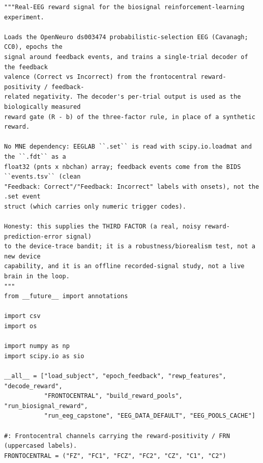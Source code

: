 \begin{lstlisting}[caption={mrl\_trace/biosignal.py},label={lst:siox-src-biosignal}]
"""Real-EEG reward signal for the biosignal reinforcement-learning experiment.

Loads the OpenNeuro ds003474 probabilistic-selection EEG (Cavanagh; CC0), epochs the
signal around feedback events, and trains a single-trial decoder of the feedback
valence (Correct vs Incorrect) from the frontocentral reward-positivity / feedback-
related negativity. The decoder's per-trial output is used as the biologically measured
reward gate (R - b) of the three-factor rule, in place of a synthetic reward.

No MNE dependency: EEGLAB ``.set`` is read with scipy.io.loadmat and the ``.fdt`` as a
float32 (pnts x nbchan) array; feedback events come from the BIDS ``events.tsv`` (clean
"Feedback: Correct"/"Feedback: Incorrect" labels with onsets), not the .set event
struct (which carries only numeric trigger codes).

Honesty: this supplies the THIRD FACTOR (a real, noisy reward-prediction-error signal)
to the device-trace bandit; it is a robustness/biorealism test, not a new device
capability, and it is an offline recorded-signal study, not a live brain in the loop.
"""
from __future__ import annotations

import csv
import os

import numpy as np
import scipy.io as sio

__all__ = ["load_subject", "epoch_feedback", "rewp_features", "decode_reward",
           "FRONTOCENTRAL", "build_reward_pools", "run_biosignal_reward",
           "run_eeg_capstone", "EEG_DATA_DEFAULT", "EEG_POOLS_CACHE"]

#: Frontocentral channels carrying the reward-positivity / FRN (uppercased labels).
FRONTOCENTRAL = ("FZ", "FC1", "FCZ", "FC2", "CZ", "C1", "C2")



\end{lstlisting}

